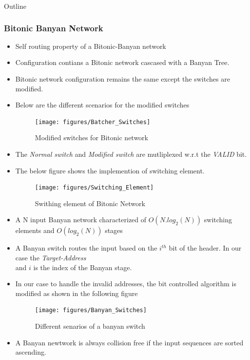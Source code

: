 \begin{frame}[allowframebreaks]{Outline}
\frametitle{Bitonic Banyan Network}
 \begin{itemize}
  \item Self routing property of a Bitonic-Banyan network \\
  \item Configuration contians a Bitonic network cascased with a Banyan Tree. \\
  \item Bitonic network configuration remains the same except the switches are modified. \\
  \item Below are the different scenarios for the modified switches\\
   \begin{figure}[!ht]
    \texttt{[image: figures/Batcher\_Switches]}
    \caption{Modified switches for Bitonic network }
  \end{figure}
  \item The \textit{Normal switch} and \textit{Modified switch} are mutliplexed w.r.t the \textit{VALID} bit.
  \item The below figure shows the implemention of switching element.
  \begin{figure}[!ht]
    \texttt{[image: figures/Switching\_Element]}
    \caption{Swithing element of Bitonic Network}
  \end{figure}
  \item A N input Banyan network characterized of $O( N.log_{2}(N))$ switching elements and $O(log_{2}(N))$ stages \\
  \item A Banyan switch routes the input based on the $i^{th}$ bit of the header. In our case the \textit{Target-Address} \\
  and  $i$ is the index of the Banyan stage.
  \item In our case to handle the invalid addresses, the bit controlled algorithm is modified as shown in the following figure \\
   \begin{figure}[!ht]
    \texttt{[image: figures/Banyan\_Switches]}
    \caption{ Different senarios of a banyan switch}
  \end{figure}
  \item  A Banyan newtwork is always collision free if the input sequences are sorted ascending.\\

\end{itemize}
\end{frame}
